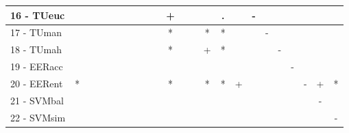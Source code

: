 \begin{table}[h]
\begin{center}
\begin{tabular}{lcc|cc|cc|cc|cc|cc|cc|cc|cc|cc|cc}
16 - TUeuc	&   &   &   &   &   &   &   &   &   & + &   &   &   & . &   & - &   &   &   &   &   &   \\ \hline
17 - TUman	&   &   &   &   &   &   &   &   &   & * &   &   & * & * &   &   & - &   &   &   &   &   \\
18 - TUmah	&   &   &   &   &   &   &   &   &   & * &   &   & + & * &   &   &   & - &   &   &   &   \\ \hline
19 - EERacc	&   &   &   &   &   &   &   &   &   &   &   &   &   &   &   &   &   &   & - &   &   &   \\
20 - EERent	& * &   &   &   &   &   &   &   &   & * &   &   & * & * & + &   &   &   &   & - & + & * \\ \hline
21 - SVMbal	&   &   &   &   &   &   &   &   &   &   &   &   &   &   &   &   &   &   &   &   & - &   \\
22 - SVMsim	&   &   &   &   &   &   &   &   &   &   &   &   &   &   &   &   &   &   &   &   &   & - \\ \hline\end{tabular}

\label{stratsfriedNB}
\end{center}
\end{table}